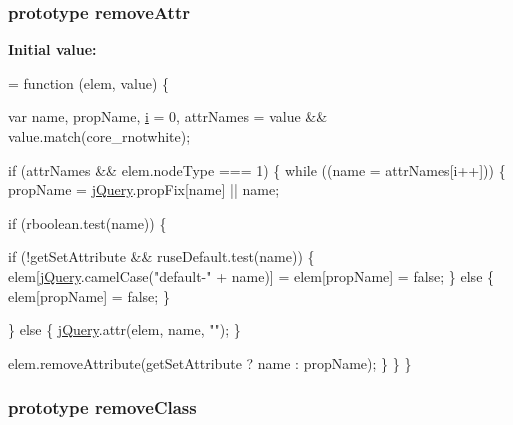 \subsubsection[{\texorpdfstring{remove\+Attr}{removeAttr}}]{ {\bf prototype} remove\+Attr}\hypertarget{jquery-2_82_81-vsdoc_8js_a1bd34fb2dc2e5231033df1cff8376a17}{}\label{jquery-2_82_81-vsdoc_8js_a1bd34fb2dc2e5231033df1cff8376a17}
{\bfseries Initial value\+:}
\begin{DoxyCode}
= \textcolor{keyword}{function} (elem, value) \{

        var name, propName,
            \hyperlink{geolocation-marker_8js_a0325b7ce0988782a8032e720ef3aa411}{i} = 0,
            attrNames = value && value.match(core\_rnotwhite);

        \textcolor{keywordflow}{if} (attrNames && elem.nodeType === 1) \{
            \textcolor{keywordflow}{while} ((name = attrNames[i++])) \{
                propName = \hyperlink{jquery-2_82_81-vsdoc_8js_add5237586d970a38a81f990e8eb28c6c}{jQuery}.propFix[name] || name;

                
                \textcolor{keywordflow}{if} (rboolean.test(name)) \{
                    
                    
                    \textcolor{keywordflow}{if} (!getSetAttribute && ruseDefault.test(name)) \{
                        elem[\hyperlink{jquery-2_82_81-vsdoc_8js_add5237586d970a38a81f990e8eb28c6c}{jQuery}.camelCase(\textcolor{stringliteral}{"default-"} + name)] =
                            elem[propName] = \textcolor{keyword}{false};
                    \} \textcolor{keywordflow}{else} \{
                        elem[propName] = \textcolor{keyword}{false};
                    \}

                    
                \} \textcolor{keywordflow}{else} \{
                    \hyperlink{jquery-2_82_81-vsdoc_8js_add5237586d970a38a81f990e8eb28c6c}{jQuery}.attr(elem, name, \textcolor{stringliteral}{""});
                \}

                elem.removeAttribute(getSetAttribute ? name : propName);
            \}
        \}
    \}
\end{DoxyCode}
\subsubsection[{\texorpdfstring{remove\+Class}{removeClass}}]{ {\bf prototype} remove\+Class}\hypertarget{jquery-2_82_81-vsdoc_8js_a7cb7158f409485c170580c2afea3e234}{}\label{jquery-2_82_81-vsdoc_8js_a7cb7158f409485c170580c2afea3e234}

